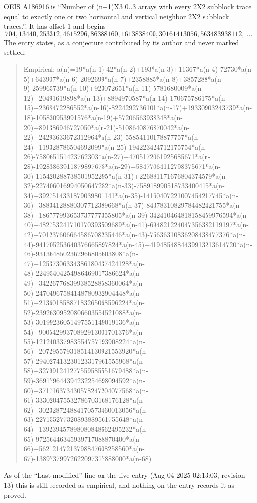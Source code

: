 \documentclass[11pt,a4paper]{article}
\theoremstyle{plain}
\theoremstyle{definition}
\begin{document}
OEIS A186916 is ``Number of (n+1)X3 0..3 arrays with every 2X2 subblock trace equal to exactly one or two horizontal and vertical neighbor 2X2 subblock traces.''. It has offset $1$ and begins
\[
704, 13440, 253312, 4615296, 86388160, 1613838400, 30161413056, 563483938112,\ \dots
\]
The entry states, as a conjecture contributed by its author and never marked settled:
\begin{quote}
Empirical: a(n)=19*a(n-1)-42*a(n-2)+193*a(n-3)+11367*a(n-4)-72730*a(n-5)+643907*a(n-6)-2092699*a(n-7)+2358885*a(n-8)+3857288*a(n-9)-259965739*a(n-10)+923072651*a(n-11)-5781680009*a(n-12)+20491619898*a(n-13)+8894970587*a(n-14)-170675786175*a(n-15)+2368472286552*a(n-16)-8224292736101*a(n-17)+19330903243739*a(n-18)-105830953991576*a(n-19)+57206563938348*a(n-20)+891386946727050*a(n-21)-5108640876870042*a(n-22)+24293633672312964*a(n-23)-55854110178877757*a(n-24)+119328786504692099*a(n-25)-194223424712175754*a(n-26)-758065151423762303*a(n-27)+4705172061925685671*a(n-28)-19283863911879897678*a(n-29)+58477064112798375671*a(n-30)-115420288738501952295*a(n-31)+226881171676804374579*a(n-32)-227406016994050647282*a(n-33)-758918990518733400415*a(n-34)+3927514331879039801141*a(n-35)-14160407221007454217745*a(n-36)+38834128880307712389668*a(n-37)-84378310829784482421755*a(n-38)+186777993653737777355805*a(n-39)-342410464818158459976594*a(n-40)+482753241710170393509689*a(n-41)-694821224047356382119197*a(n-42)+701237606664586708235446*a(n-43)-75636310836208438477376*a(n-44)-941705253640376665897824*a(n-45)+4194854884439913213614720*a(n-46)-9313648502362966805603808*a(n-47)+12537306334386180437424128*a(n-48)-22495404254986469017386624*a(n-49)+34226776839938528858360064*a(n-50)-24704967584148780932904448*a(n-51)+21360185887183265068596224*a(n-52)-23926309520806603554521088*a(n-53)-30199236051497551149019136*a(n-54)+90054299370892913001701376*a(n-55)-121240337983554757193908224*a(n-56)+207295579318514130921553920*a(n-57)-294027413230123317961555968*a(n-58)+327991241277559585551679488*a(n-59)-369179644394232254698094592*a(n-60)+371716373430578247204077568*a(n-61)-333020475532786703168176128*a(n-62)+302328724884170573460013056*a(n-63)-227155277320893889561755648*a(n-64)+139239457898080848662495232*a(n-65)-97256446345939717088870400*a(n-66)+56212147213798847608258560*a(n-67)-13897379972622097317888000*a(n-68)
\end{quote}
As of the ``Last modified'' line on the live entry (Aug 04 2025 02:13:03, revision 13) this is still
recorded as empirical, and nothing on the entry records it as proved.
\end{document}

